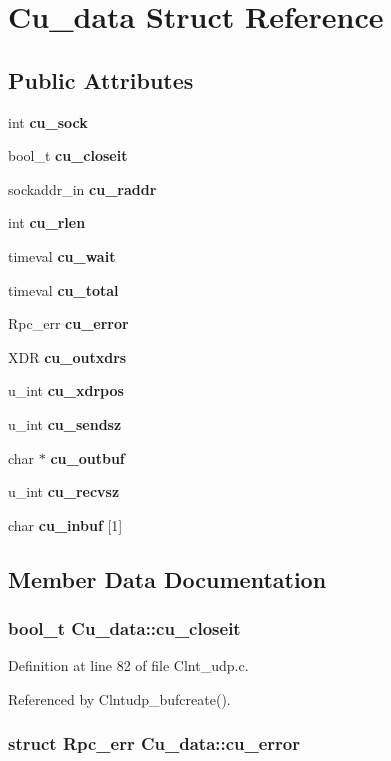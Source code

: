 \section{Cu\_\-data Struct Reference}
\label{structCu__data}
\subsection*{Public Attributes}
\begin{CompactItemize}
\item 
int {\bf cu\_\-sock}
\item 
bool\_\-t {\bf cu\_\-closeit}
\item 
sockaddr\_\-in {\bf cu\_\-raddr}
\item 
int {\bf cu\_\-rlen}
\item 
timeval {\bf cu\_\-wait}
\item 
timeval {\bf cu\_\-total}
\item 
Rpc\_\-err {\bf cu\_\-error}
\item 
XDR {\bf cu\_\-outxdrs}
\item 
u\_\-int {\bf cu\_\-xdrpos}
\item 
u\_\-int {\bf cu\_\-sendsz}
\item 
char $\ast$ {\bf cu\_\-outbuf}
\item 
u\_\-int {\bf cu\_\-recvsz}
\item 
char {\bf cu\_\-inbuf} [1]
\end{CompactItemize}


\subsection{Member Data Documentation}
\subsubsection{\setlength{\rightskip}{0pt plus 5cm}bool\_\-t {\bf Cu\_\-data::cu\_\-closeit}}\label{structCu__data_o1}




Definition at line 82 of file Clnt\_\-udp.c.

Referenced by Clntudp\_\-bufcreate().
\subsubsection{\setlength{\rightskip}{0pt plus 5cm}struct Rpc\_\-err {\bf Cu\_\-data::cu\_\-error}}\label{structCu__data_o6}




